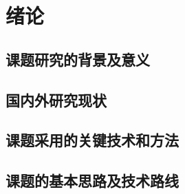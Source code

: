 \chapter{绪论}
\section{课题研究的背景及意义}

\section{国内外研究现状}

\section{课题采用的关键技术和方法}

\section{课题的基本思路及技术路线}

